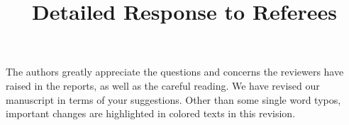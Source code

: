 \documentclass[10pt]{amsart}
\theoremstyle{definition}
\theoremstyle{remark}
\begin{document}
\title{\large Detailed Response to Referees}%

\date{}%

\maketitle

The authors greatly appreciate the questions and concerns the reviewers have raised in the reports, as well as the careful reading. 
We have revised our manuscript in terms of your suggestions. 
Other than some single word typos, important changes are highlighted in colored texts in this revision. 



\tableofcontents


\vskip0.5cm
\end{document}
